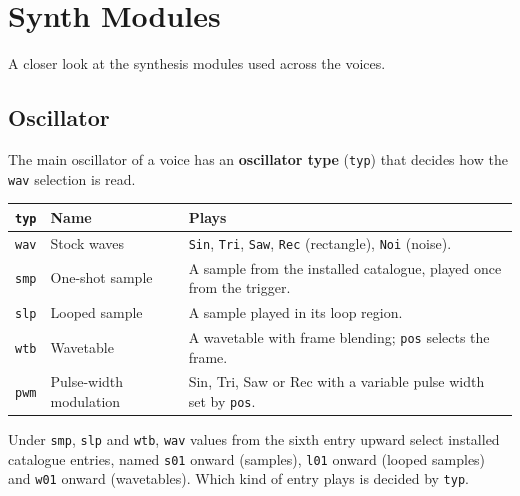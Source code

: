 \section{Synth Modules}\label{synth-modules}

A closer look at the synthesis modules used across the voices.

\subsection{Oscillator}\label{oscillator}

The main oscillator of a voice has an \textbf{oscillator type}
(\texttt{typ}) that decides how the \texttt{wav} selection is read.

{\def\LTcaptype{none} %
\begin{longtable}[]{@{}
  >{\raggedright\arraybackslash}p{}
  >{\raggedright\arraybackslash}p{}
  >{\raggedright\arraybackslash}p{}@{}}
\toprule\noalign{}
\begin{minipage}[b]{\linewidth}\raggedright
\texttt{typ}
\end{minipage} & \begin{minipage}[b]{\linewidth}\raggedright
Name
\end{minipage} & \begin{minipage}[b]{\linewidth}\raggedright
Plays
\end{minipage} \\
\midrule\noalign{}
\endhead
\bottomrule\noalign{}
\endlastfoot
\texttt{wav} & Stock waves & \texttt{Sin}, \texttt{Tri}, \texttt{Saw},
\texttt{Rec} (rectangle), \texttt{Noi} (noise). \\
\texttt{smp} & One-shot sample & A sample from the installed catalogue,
played once from the trigger. \\
\texttt{slp} & Looped sample & A sample played in its loop region. \\
\texttt{wtb} & Wavetable & A wavetable with frame blending; \texttt{pos}
selects the frame. \\
\texttt{pwm} & Pulse-width modulation & Sin, Tri, Saw or Rec with a
variable pulse width set by \texttt{pos}. \\
\end{longtable}
}

Under \texttt{smp}, \texttt{slp} and \texttt{wtb}, \texttt{wav} values
from the sixth entry upward select installed catalogue entries, named
\texttt{s01} onward (samples), \texttt{l01} onward (looped samples) and
\texttt{w01} onward (wavetables). Which kind of entry plays is decided
by \texttt{typ}.

